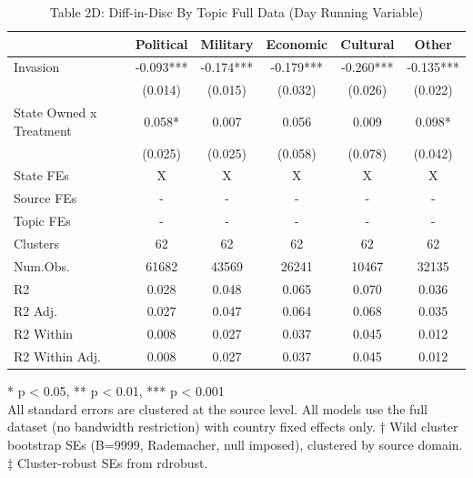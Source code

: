 \begin{table}[t]
\caption{\label{tab:table2d}Table 2D: Diff-in-Disc By Topic Full Data (Day Running Variable)} 
\fontsize{12.0pt}{14.0pt}\selectfont
\begin{tabular*}{\linewidth}{@{\extracolsep{\fill}}lccccc}
\toprule
  & Political & Military & Economic & Cultural & Other \\ 
\midrule\addlinespace[2.5pt]
Invasion & -0.093*** & -0.174*** & -0.179*** & -0.260*** & -0.135*** \\ 
 & (0.014) & (0.015) & (0.032) & (0.026) & (0.022) \\ 
State Owned x Treatment & 0.058* & 0.007 & 0.056 & 0.009 & 0.098* \\ 
{} & {(0.025)} & {(0.025)} & {(0.058)} & {(0.078)} & {(0.042)} \\ 
State FEs & X & X & X & X & X \\ 
Source FEs & - & - & - & - & - \\ 
Topic FEs & - & - & - & - & - \\ 
Clusters & 62 & 62 & 62 & 62 & 62 \\ 
Num.Obs. & 61682 & 43569 & 26241 & 10467 & 32135 \\ 
R2 & 0.028 & 0.048 & 0.065 & 0.070 & 0.036 \\ 
R2 Adj. & 0.027 & 0.047 & 0.064 & 0.068 & 0.035 \\ 
R2 Within & 0.008 & 0.027 & 0.037 & 0.045 & 0.012 \\ 
R2 Within Adj. & 0.008 & 0.027 & 0.037 & 0.045 & 0.012 \\ 
\bottomrule
\end{tabular*}
\begin{minipage}{\linewidth}
\vspace{.05em}
* p < 0.05, ** p < 0.01, *** p < 0.001\\
All standard errors are clustered at the source level. All models use the full
dataset (no bandwidth restriction) with country fixed effects only. † Wild
cluster bootstrap SEs (B=9999, Rademacher, null imposed), clustered by source
domain. ‡ Cluster-robust SEs from rdrobust.\\
\end{minipage}
\end{table}

